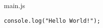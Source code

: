 \begin{listtitle}
main.js
\end{listtitle}
\begin{lstlisting}
console.log("Hello World!");
\end{lstlisting}
\listend
